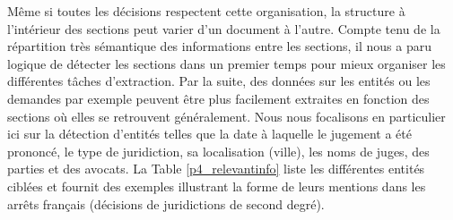  Même si toutes les décisions respectent cette organisation, la structure à l'intérieur des sections peut varier d'un document à l'autre. Compte tenu de la répartition très sémantique des informations entre les sections, il nous a paru logique de détecter les sections dans un premier temps pour mieux organiser les différentes tâches d'extraction. Par la suite, des données sur les entités ou les demandes par exemple peuvent être plus facilement extraites en fonction des sections où elles se retrouvent généralement. Nous nous focalisons en particulier ici sur la détection d'entités telles que la date à laquelle le jugement a été prononcé, le type de juridiction, sa localisation (ville), les noms de juges, des parties et des avocats. La Table \ref{p4_relevantinfo} liste les différentes entités ciblées et fournit des exemples illustrant la forme de leurs mentions dans les arrêts français (décisions de juridictions de second degré).


